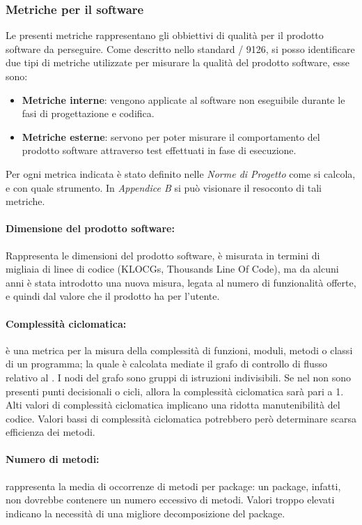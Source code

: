 \subsubsection{Metriche per il software}
Le presenti metriche rappresentano gli obbiettivi di qualità per il prodotto software da perseguire. Come descritto nello standard / 9126, si posso identificare due tipi di metriche utilizzate per misurare la qualità del prodotto software, esse sono:
    \begin{itemize}
      \item \textbf{Metriche interne}: vengono applicate al software non eseguibile durante le fasi di progettazione e codifica.
      \item \textbf{Metriche esterne}: servono per poter misurare il comportamento del prodotto software attraverso test effettuati in fase di esecuzione.
    \end{itemize}
Per ogni metrica indicata è stato definito nelle \emph{Norme di Progetto \VersioneNP{}} come si calcola, e con quale strumento. In \emph{Appendice B} si può visionare il resoconto di tali metriche.

\paragraph{Dimensione del prodotto software:} Rappresenta le dimensioni del prodotto software, è misurata in termini di migliaia di linee di codice (KLOCGs, Thousands Line Of Code), ma da alcuni anni è stata introdotto una nuova misura, legata al numero di funzionalità offerte, e quindi dal valore che il prodotto ha per l’utente.

\paragraph{Complessità ciclomatica:} è una metrica per la misura della complessità di funzioni, moduli, metodi o classi di un programma; la quale è calcolata mediate il grafo di controllo di flusso relativo al .
            I nodi del grafo sono gruppi di istruzioni indivisibili. Se nel  non sono presenti punti decisionali o cicli, allora la complessità ciclomatica sarà pari a 1.
            Alti valori di complessità ciclomatica implicano una ridotta manutenibilità del codice. Valori bassi di complessità ciclomatica potrebbero però determinare scarsa efficienza dei metodi.
            
\paragraph{Numero di metodi:} rappresenta la media di occorrenze di metodi per package: un package, infatti, non dovrebbe contenere un numero eccessivo di metodi. Valori troppo elevati indicano la necessità di una migliore decomposizione del package.

